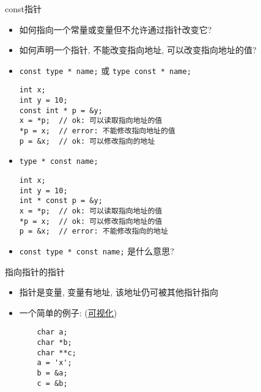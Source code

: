 \begin{frame}[fragile]{const指针}
    \begin{itemize}[<+- | alert@+>]
        \item 如何指向一个常量或变量但不允许通过指针改变它?
        \item 如何声明一个指针, 不能改变指向地址, 可以改变指向地址的值?
        \emptyline
        \item \texttt{const type * name;} 或 \texttt{type const * name;}
        \scriptsize\begin{verbatim}
int x;
int y = 10;
const int * p = &y;
x = *p;  // ok: 可以读取指向地址的值
*p = x;  // error: 不能修改指向地址的值
p = &x;  // ok: 可以修改指向的地址
        \end{verbatim}
        \item \texttt{type * const name;}
        \scriptsize\begin{verbatim}
int x;
int y = 10;
int * const p = &y;
x = *p;  // ok: 可以读取指向地址的值
*p = x;  // ok: 可以修改指向地址的值
p = &x;  // error: 不能修改指向的地址
        \end{verbatim}
        \item \texttt{const type * const name;} 是什么意思?
    \end{itemize}
\end{frame}

\begin{frame}[fragile]{指向指针的指针}
    \begin{itemize}[<+- | alert@+>]
        \item 指针是变量, 变量有地址, 该地址仍可被其他指针指向
        \item 一个简单的例子: (\href{http://pythontutor.com/c.html#code=\%23include\%20\%3Cstdio.h\%3E\%0A\%0Aint\%20main\%28\%29\%20\%7B\%0A\%20\%20char\%20a\%3B\%0A\%20\%20char\%20*b\%3B\%0A\%20\%20char\%20**c\%3B\%0A\%20\%20a\%20\%3D\%20'x'\%3B\%0A\%20\%20b\%20\%3D\%20\%26a\%3B\%0A\%20\%20c\%20\%3D\%20\%26b\%3B\%0A\%0A\%20\%20printf\%28\%22\%25c\%5Cn\%22,\%20**c\%29\%3B\%0A\%20\%20return\%200\%3B\%0A\%7D&mode=edit&origin=opt-frontend.js&py=c&rawInputLstJSON=\%5B\%5D}{可视化})
        \begin{verbatim}
    char a;
    char *b;
    char **c;
    a = 'x';
    b = &a;
    c = &b;
        \end{verbatim}
    \end{itemize}
\end{frame}

